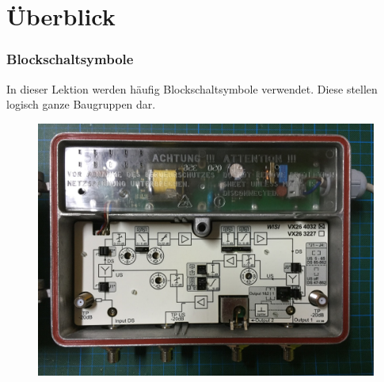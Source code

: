 

\subtitle{Technik Klasse A 13: \\
Frequenzaufbereitung \\[2em]}
\date{Stand 27.02.2017}


\section{Überblick}

\begin{frame}
  \frametitle{Blockschaltsymbole}
  In dieser Lektion werden häufig Blockschaltsymbole verwendet. Diese stellen logisch ganze Baugruppen dar.

  \begin{center}
    \begin{figure}
      \includegraphics[width=\textwidth,height=.65\textheight,keepaspectratio]{a13/IMG_4686.jpg}
    \end{figure}
  \end{center}
\end{frame}

